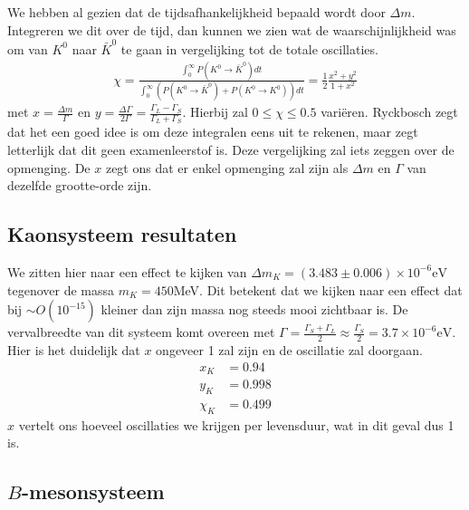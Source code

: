 \documentclass[../main.tex]{subfiles}
\begin{document}
We hebben al gezien dat de tijdsafhankelijkheid bepaald wordt door $\Delta m$. Integreren we dit over de tijd, dan kunnen we zien wat de waarschijnlijkheid was om van $K^0$ naar $\bar{K}^0$ te gaan in vergelijking tot de totale oscillaties.
\begin{equation}
    \begin{aligned}
        \label{eq:kaon_osc_tijd_int}
        \chi=\frac{\int_{0}^{\infty} P\left(K^{0} \rightarrow \bar{K}^{0}\right) d t}{\int_{0}^{\infty}\left(P\left(K^{0} \rightarrow \bar{K}^{0}\right)+P\left(K^{0} \rightarrow K^{0}\right)\right) d t}=\frac{1}{2} \frac{x^{2}+y^{2}}{1+x^{2}}
    \end{aligned}
\end{equation}
met $x= \frac{\Delta m}{\Gamma}$ en $y= \frac{\Delta \Gamma}{2\Gamma} = \frac{\Gamma_L-\Gamma_S}{\Gamma_L + \Gamma_S}$. Hierbij zal $0\leq \chi \leq 0.5$ variëren. {\color{blue} Ryckbosch zegt dat het een goed idee is om deze integralen eens uit te rekenen, maar zegt letterlijk dat dit geen examenleerstof is.} Deze vergelijking zal iets zeggen over de opmenging. De $x$ zegt ons dat er enkel opmenging zal zijn als $\Delta m$ en $\Gamma$ van dezelfde grootte-orde zijn.

\subsection{Kaonsysteem resultaten}%
\label{sub:kaon_systeem_resultaten}

We zitten hier naar een effect te kijken van $\Delta m_K = (3.483 \pm 0.006) \times 10^{-6} \text{eV}$ tegenover de massa $m_K = 450$MeV. Dit betekent dat we kijken naar een effect dat bij $\sim O(10^{-15})$ kleiner dan zijn massa nog steeds mooi zichtbaar is. De vervalbreedte van dit systeem komt overeen met $\Gamma=\frac{\Gamma_{S}+\Gamma_{L}}{2} \approx \frac{\Gamma_{S}}{2}=3.7 \times 10^{-6} \text{eV}$. Hier is het duidelijk dat $x$ ongeveer 1 zal zijn en de oscillatie zal doorgaan.
\begin{equation}
    \begin{aligned}
        \label{eq:kaon_osc_exp_results}
        x_{K} &=0.94 \\
        y_{K} &=0.998 \\
        \chi_{K} &=0.499
    \end{aligned}
\end{equation}
$x$ vertelt ons hoeveel oscillaties we krijgen per levensduur, wat in dit geval dus 1 is.

\subsection{$B$-mesonsysteem}%
\label{sub:_b_meson_systeem}
\end{document}
